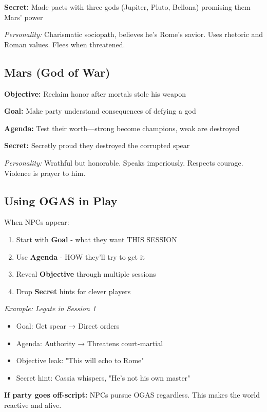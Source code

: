 \documentclass[letterpaper,oneside,twocolumn,openany]{dndbook}
\begin{document}
\textbf{Secret:} Made pacts with three gods (Jupiter, Pluto, Bellona) promising them Mars' power

\textit{Personality:} Charismatic sociopath, believes he's Rome's savior. Uses rhetoric and Roman values. Flees when threatened.

\subsection{Mars (God of War)}

\textbf{Objective:} Reclaim honor after mortals stole his weapon

\textbf{Goal:} Make party understand consequences of defying a god

\textbf{Agenda:} Test their worth—strong become champions, weak are destroyed

\textbf{Secret:} Secretly proud they destroyed the corrupted spear

\textit{Personality:} Wrathful but honorable. Speaks imperiously. Respects courage. Violence is prayer to him.

\subsection{Using OGAS in Play}

When NPCs appear:
\begin{enumerate}
\item Start with \textbf{Goal} - what they want THIS SESSION
\item Use \textbf{Agenda} - HOW they'll try to get it
\item Reveal \textbf{Objective} through multiple sessions
\item Drop \textbf{Secret} hints for clever players
\end{enumerate}

\textit{Example: Legate in Session 1}
\begin{itemize}
\item Goal: Get spear → Direct orders
\item Agenda: Authority → Threatens court-martial
\item Objective leak: "This will echo to Rome"
\item Secret hint: Cassia whispers, "He's not his own master"
\end{itemize}

\textbf{If party goes off-script:} NPCs pursue OGAS regardless. This makes the world reactive and alive.
\end{document}
